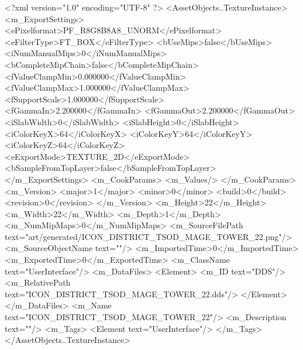 <?xml version="1.0" encoding="UTF-8" ?>
<AssetObjects..TextureInstance>
	<m_ExportSettings>
		<ePixelformat>PF_R8G8B8A8_UNORM</ePixelformat>
		<eFilterType>FT_BOX</eFilterType>
		<bUseMips>false</bUseMips>
		<iNumManualMips>0</iNumManualMips>
		<bCompleteMipChain>false</bCompleteMipChain>
		<fValueClampMin>0.000000</fValueClampMin>
		<fValueClampMax>1.000000</fValueClampMax>
		<fSupportScale>1.000000</fSupportScale>
		<fGammaIn>2.200000</fGammaIn>
		<fGammaOut>2.200000</fGammaOut>
		<iSlabWidth>0</iSlabWidth>
		<iSlabHeight>0</iSlabHeight>
		<iColorKeyX>64</iColorKeyX>
		<iColorKeyY>64</iColorKeyY>
		<iColorKeyZ>64</iColorKeyZ>
		<eExportMode>TEXTURE_2D</eExportMode>
		<bSampleFromTopLayer>false</bSampleFromTopLayer>
	</m_ExportSettings>
	<m_CookParams>
		<m_Values/>
	</m_CookParams>
	<m_Version>
		<major>1</major>
		<minor>0</minor>
		<build>0</build>
		<revision>0</revision>
	</m_Version>
	<m_Height>22</m_Height>
	<m_Width>22</m_Width>
	<m_Depth>1</m_Depth>
	<m_NumMipMaps>0</m_NumMipMaps>
	<m_SourceFilePath text="art/generated/ICON_DISTRICT_TSOD_MAGE_TOWER_22.png"/>
	<m_SourceObjectName text=""/>
	<m_ImportedTime>0</m_ImportedTime>
	<m_ExportedTime>0</m_ExportedTime>
	<m_ClassName text="UserInterface"/>
	<m_DataFiles>
		<Element>
			<m_ID text="DDS"/>
			<m_RelativePath text="ICON_DISTRICT_TSOD_MAGE_TOWER_22.dds"/>
		</Element>
	</m_DataFiles>
	<m_Name text="ICON_DISTRICT_TSOD_MAGE_TOWER_22"/>
	<m_Description text=""/>
	<m_Tags>
		<Element text="UserInterface"/>
	</m_Tags>
</AssetObjects..TextureInstance>
